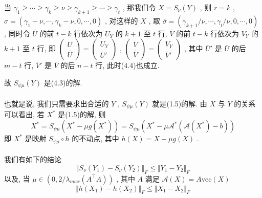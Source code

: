 \documentclass[UTF8]{ctexart}
\numberwithin{equation}{section}
\begin{document}
			当 $\gamma_1 \ge \cdots \ge \gamma_k \ge \nu \ge \gamma_{k+1} \ge \cdots \ge \gamma_t$ , 那我们令 $X = S_\nu(Y)$ , 则 $r = k$ , $\sigma = (\gamma_1 - \nu, \cdots, \gamma_k - \nu, 0, \cdots, 0)$ , 对这样的 $X$ , 取 $\bar{\sigma} = (\gamma_{k+1}/\nu, \cdots, \gamma_{t}/\nu, 0, \cdots, 0)$ , 同时令 $\bar{U}$ 的前 $t - k$ 行依次为 $U_Y$ 的 $k + 1$ 至 $t$ 行, $\bar{V}$ 的前 $t - k$ 行依次为 $V_Y$ 的 $k + 1$ 至 $t$ 行, 即 
				$
					\begin{pmatrix}
						U \\ \bar{U}
					\end{pmatrix} 
					=
					\begin{pmatrix}
						U_Y \\ \bar{U}'
					\end{pmatrix}
				$ ,
				$
					\begin{pmatrix}
						V \\ \bar{V}
					\end{pmatrix} 
					=
					\begin{pmatrix}
						V_Y \\ \bar{V}'
					\end{pmatrix}
				$ ,
			其中 $\bar{U}'$ 是 $\bar{U}$ 的后 $m - t$ 行, $\bar{V}'$ 是 $\bar{V}$ 的后 $n - t$ 行, 此时(4.4)也成立.

			故 $S_{\psi \mu}(Y)$ 是(4.3)的解.
		
		\paragraph{}
			\quad 也就是说, 我们只需要求出合适的 $Y$ , $S_{\psi \mu}(Y)$ 就是(1.5)的解. 由 $X$ 与 $Y$ 的关系可以看出, 若 $X^*$ 是(1.5)的解, 则
				\begin{equation}
					X^* = S_{\psi \mu}(X^* - \mu g(X^*)) = S_{\psi \mu}(X^* - \mu \mathcal{A}^*(\mathcal{A}(X^*) - b))
				\end{equation}
			即 $X^*$ 是映射 $S_{\psi \mu} \circ h$ 的不动点, 其中 $h(X) = X - \mu g(X)$ .

		\paragraph{}
			\quad 我们有如下的结论
				\begin{equation}
					\Vert{S_\nu(Y_1) - S_\nu(Y_2)}\Vert_F \le \Vert{Y_1 - Y_2}\Vert_F
				\end{equation}
			以及, 当 $\mu \in (0, 2/\lambda_{max}(A ^\top A))$ , 其中 $A$ 满足 $\mathcal{A}(X) = A \text{vec}(X)$
				\begin{equation}
					\Vert{h(X_1) - h(X_2)}\Vert_F \le \Vert{X_1 - X_2}\Vert_F
				\end{equation}
		
\end{document}
